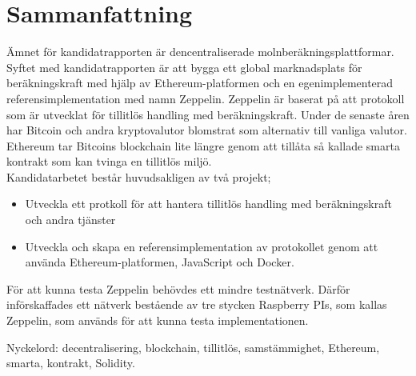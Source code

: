 
\thispagestyle{plain}			%
\section*{Sammanfattning}
Ämnet för kandidatrapporten är dencentraliserade molnberäkningsplattformar. Syftet med kandidatrapporten är att bygga ett global marknadsplats för beräkningskraft med hjälp av Ethereum-platformen och en egenimplementerad referensimplementation med namn Zeppelin. Zeppelin är baserat på att protokoll som är utvecklat för tillitlös handling med beräkningskraft. Under de senaste åren har Bitcoin och andra kryptovalutor blomstrat som alternativ till vanliga valutor. Ethereum tar Bitcoins blockchain lite längre genom att tillåta så kallade smarta kontrakt som kan tvinga en tillitlös miljö.\\ \newline
Kandidatarbetet består huvudsakligen av två projekt;
\begin{itemize}
\item Utveckla ett protkoll för att hantera tillitlös handling med beräkningskraft och andra tjänster
\item Utveckla och skapa en referensimplementation av protokollet genom att använda Ethereum-platformen, JavaScript och Docker.\newline
\end{itemize}
För att kunna testa Zeppelin behövdes ett mindre testnätverk. Därför införskaffades ett nätverk bestående av tre stycken Raspberry PIs, som kallas Zeppelin, som används för att kunna testa implementationen.

\vfill
\noindent Nyckelord: decentralisering, blockchain, tillitlös, samstämmighet, Ethereum, smarta, kontrakt, Solidity.

\newpage				%
\thispagestyle{empty}
\mbox{}